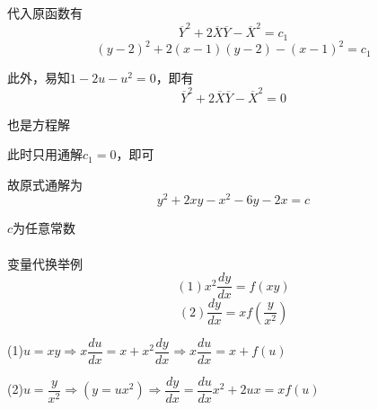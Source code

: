 \documentclass[oneside]{book} %
\begin{document}
代入原函数有
$$\overline{Y}^{2} + 2\overline{X}\overline{Y} - \overline{X}^{2} = c_{1}$$
$$(y - 2)^{2} + 2(x - 1)(y - 2) - (x - 1)^{2} = c_{1}$$

此外，易知$1 - 2u - u^{2} = 0$，即有
$$\overline{Y}^{2} + 2\overline{X}\overline{Y} - \overline{X}^{2} = 0$$

也是方程解

此时只用通解$c_{1} = 0$，即可

故原式通解为
$$y^{2} + 2xy - x^{2} - 6y - 2x = c$$

$c$为任意常数
\\ \hspace*{\fill} \\
\noindent {}变量代换举例
$$(1)x^{2}\dfrac{dy}{dx} = f(xy)$$
$$(2)\dfrac{dy}{dx} = xf\left(\dfrac{y}{x^{2}}\right) $$

(1)$u = xy \Rightarrow x\dfrac{du}{dx} = x + x^{2}\dfrac{dy}{dx} \Rightarrow x\dfrac{du}{dx} = x + f(u)$

(2)$u = \dfrac{y}{x^{2}} \Rightarrow (y = ux^{2}) \Rightarrow \dfrac{dy}{dx} = \dfrac{du}{dx}x^{2} + 2ux = xf(u)$
\end{document}
